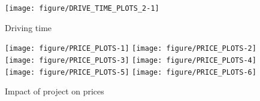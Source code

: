 \documentclass{article}\usepackage[]{graphicx}\usepackage[]{color}
\newenvironment{knitrout}{}{} %
\begin{document}
\begin{knitrout}\scriptsize
{}\color{fgcolor}\begin{figure}
\texttt{[image: figure/DRIVE\_TIME\_PLOTS\_2-1]} \caption[Driving time]{Driving time}\label{fig:DRIVE_TIME_PLOTS_2}
\end{figure}


\end{knitrout}


\begin{knitrout}\scriptsize
{}\color{fgcolor}\begin{figure}
\texttt{[image: figure/PRICE\_PLOTS-1]} 
\texttt{[image: figure/PRICE\_PLOTS-2]} 
\texttt{[image: figure/PRICE\_PLOTS-3]} 
\texttt{[image: figure/PRICE\_PLOTS-4]} 
\texttt{[image: figure/PRICE\_PLOTS-5]} 
\texttt{[image: figure/PRICE\_PLOTS-6]} \caption[Impact of project on prices]{Impact of project on prices}\label{fig:PRICE_PLOTS}
\end{figure}


\end{knitrout}
\end{document}
